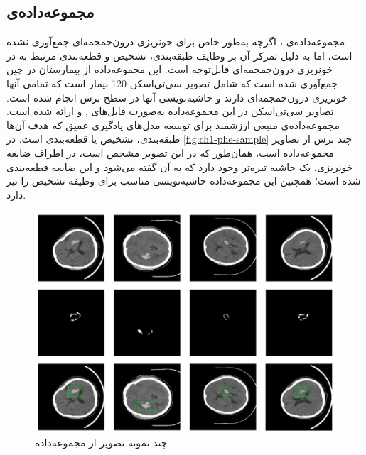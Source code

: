  \subsection{مجموعه‌داده‌ی }
 مجموعه‌داده‌ی 
 \cite{PHE_ma2024phe}
 ، اگرچه به‌طور خاص برای خونریزی درون‌جمجمه‌ای جمع‌آوری نشده است، اما به دلیل تمرکز آن بر وظایف طبقه‌بندی، تشخیص و قطعه‌بندی مرتبط به 
  در خونریزی‌ درون‌جمجمه‌ای قابل‌توجه است. این مجموعه‌داده‌ از بیمارستان 
  در چین جمع‌آوری شده است که 
   شامل تصویر سی‌تی‌اسکن 120 بیمار است که تمامی آنها خونریزی درون‌جمجمه‌ای دارند و حاشیه‌نویسی آنها در سطح برش انجام شده است. تصاویر سی‌تی‌اسکن در این مجموعه‌داده به‌صورت فایل‌های 
   ,
    و
   ارائه شده است. مجموعه‌داده‌ی 
    منبعی ارزشمند برای توسعه مدل‌های یادگیری عمیق که هدف آن‌ها طبقه‌بندی، تشخیص یا قطعه‌بندی است. در
   \autoref{fig:ch1-phe-sample}
 چند برش از تصاویر مجموعه‌داده 
 است، همان‌طور  که در این تصویر مشخص است،‌ در اطراف ضایعه خونریزی،‌ یک حاشیه تیره‌تر وجود دارد که به آن 
 گفته می‌شود و این ضایعه قطعه‌بندی شده است؛ همچنین این مجموعه‌داده حاشیه‌نویسی مناسب برای وظیفه تشخیص را نیز دارد.
 \begin{figure}[H]
 \centering
 \includegraphics[width=1.0\linewidth]{"Images/Chapter1/PHE sample"}
 \caption{چند نمونه تصویر از مجموعه‌داده 
 }
 \label{fig:ch1-phe-sample}
 \end{figure}
 
